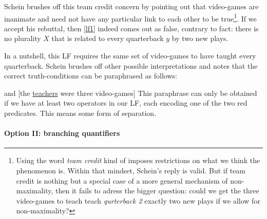 \documentclass[english]{article}
\begin{document}
Schein brushes off this team credit concern by pointing out that video-games are inanimate and need not have any particular link to each other to be true\footnote{Using the word \emph{team credit} kind of imposes restrictions on what we think the phenomenon is. Within that mindset, Schein's reply is valid. But if team credit is nothing but a special case of a more general mechanism of non-maximality, then it fails to adress the bigger question: could we get the three video-games to teach teach \emph{qurterback 2} exactly two new plays if we allow for non-maximality?}. If we accept his rebuttal, then \cref{lf1} indeed comes out as false, contrary to fact: there is no plurality $X$ that is related to every quarterback $y$ by two new plays.

In a nutshell, this LF requires the same set of video-games to have taught every quarterback. Schein brushes off other possible interpretations and notes that the correct truth-conditions can be paraphrased as follows:

 and [the \underline{teachers} were three video-games]
\xe
%
This paraphrase can only be obtained if we have at least two operators in our LF, each encoding one of the two red predicates. This means some form of separation.


\paragraph{Option II: branching quantifiers}
\end{document}
